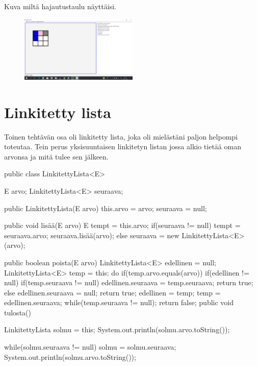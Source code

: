 Kuva miltä hajautustaulu näyttäisi.



\begin{figure}
\centering \includegraphics[width=0.5\textwidth]{kuvat/Hajautustaulu}
\label{Hajautustaulu} 
\end{figure}



\section{Linkitetty lista}

\label{Linkitetty lista}
 Toinen tehtävän osa oli linkitetty lista, joka oli mielästäni paljon helpompi toteutaa. Tein perus yksisuuntaisen linkitetyn listan 
 jossa alkio tietää oman arvonsa ja mitä tulee sen jälkeen.
 \begin{javacode}
 
 public class LinkitettyLista<E> {
	E arvo;
	LinkitettyLista<E> seuraava;
	
	public LinkitettyLista(E arvo) {
		this.arvo = arvo;
		seuraava = null;
	}
	
	public void lisää(E arvo) {
		E tempt = this.arvo;
			if(seuraava != null) {
				tempt = seuraava.arvo;
				seuraava.lisää(arvo);			}
			else {
				seuraava = new LinkitettyLista<E>(arvo);
		}
	}
		
				
	
	public boolean poista(E arvo) {
		LinkitettyLista<E> edellinen = null;
		LinkitettyLista<E> temp = this;
		do {
			if(temp.arvo.equals(arvo)) {
				if(edellinen != null) {
					if(temp.seuraava != null) {
						edellinen.seuraava = temp.seuraava;
						return true;
					}else {
						edellinen.seuraava = null;
						return true;
					}
				}
			}
			edellinen = temp;
			temp = edellinen.seuraava;
		}
		while(temp.seuraava != null);
		return false;
	}
	public void tulosta() {
		LinkitettyLista solmu = this;
		System.out.println(solmu.arvo.toString());
		
		while(solmu.seuraava != null) {
			solmu = solmu.seuraava;
			System.out.println(solmu.arvo.toString());
		}
	}
}
    
\end{javacode}

